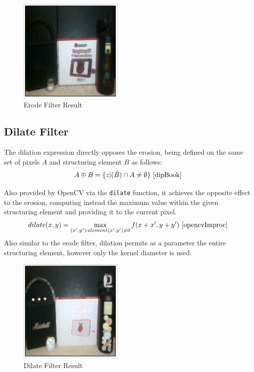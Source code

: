 \begin{figure}[H]
	\includegraphics[width=0.45\textwidth, height=0.45\textwidth]{resources/Erode_2.png}
	\caption{Erode Filter Result}
\end{figure}

\subsection{Dilate Filter}

The dilation expression directly opposes the erosion, being defined on the same set of pixels \(A\) and
structuring element \(B\) as follows:
\[A \oplus B = \{z | (\hat{B}) \cap A \neq \emptyset\}\text{ \cite{dipBook}}\]

Also provided by OpenCV via the \verb|dilate| function, it achieves the opposite effect to the erosion,
computing instead the maximum value within the given structuring element and providing it to the current
pixel.
\[dilate(x, y) = \max\limits_{(x', y'): element(x', y') \neq 0} f(x + x', y + y')\text{ \cite{opencvImproc}}\]
Also similar to the erode filter, dilation permits as a parameter the entire structuring element, however
only the kernel diameter is used.

\begin{figure}[H]
	\includegraphics[width=0.45\textwidth, height=0.45\textwidth]{resources/Dilate_2.png}
	\caption{Dilate Filter Result}
\end{figure}

